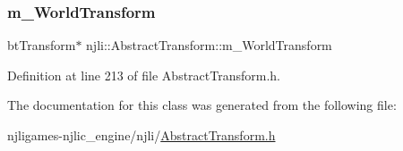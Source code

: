 \subsubsection{\texorpdfstring{m\+\_\+\+World\+Transform}{m\_WorldTransform}}
{\footnotesize\ttfamily bt\+Transform$\ast$ njli\+::\+Abstract\+Transform\+::m\+\_\+\+World\+Transform\hspace{0.3cm}{\ttfamily [private]}}



Definition at line 213 of file Abstract\+Transform.\+h.



The documentation for this class was generated from the following file\+:\begin{DoxyCompactItemize}
\item 
njligames-\/njlic\+\_\+engine/njli/\mbox{\hyperlink{_abstract_transform_8h}{Abstract\+Transform.\+h}}\end{DoxyCompactItemize}
